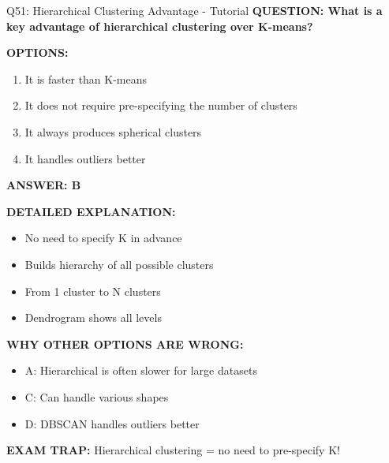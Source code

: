 \documentclass[8pt]{beamer}
\begin{document}
	\begin{frame}{Q51: Hierarchical Clustering Advantage - Tutorial}
		\fontsize{6.5}{7.5}\selectfont
		\textbf{QUESTION: What is a key advantage of hierarchical clustering over K-means?}
		
		\vspace{0.1cm}
		\textbf{OPTIONS:}
		\begin{enumerate}
			\item It is faster than K-means
			\item It does not require pre-specifying the number of clusters
			\item It always produces spherical clusters
			\item It handles outliers better
		\end{enumerate}
		
		\vspace{0.1cm}
		\textcolor{myblue}{\textbf{ANSWER: B}}
		
		\vspace{0.1cm}
		\textbf{DETAILED EXPLANATION:}
		\begin{itemize}
			\item No need to specify K in advance
			\item Builds hierarchy of all possible clusters
			\item From 1 cluster to N clusters
			\item Dendrogram shows all levels
		\end{itemize}
		
		\vspace{0.1cm}
		\textcolor{myred}{\textbf{WHY OTHER OPTIONS ARE WRONG:}}
		\begin{itemize}
			\item \textcolor{myred}{A:} Hierarchical is often slower for large datasets
			\item \textcolor{myred}{C:} Can handle various shapes
			\item \textcolor{myred}{D:} DBSCAN handles outliers better
		\end{itemize}
		
		\textcolor{myred}{\textbf{EXAM TRAP:}} Hierarchical clustering = \textcolor{myblue}{no need to pre-specify K}!
	\end{frame}
	
\end{document}

